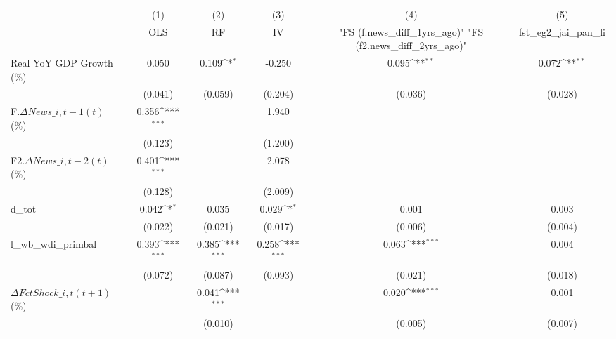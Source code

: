 {
\def\sym#1{\ifmmode^{#1}\else\(^{#1}\)\fi}
\begin{tabular}{l*{5}{c}}
\toprule
                    &\multicolumn{1}{c}{(1)}&\multicolumn{1}{c}{(2)}&\multicolumn{1}{c}{(3)}&\multicolumn{1}{c}{(4)}&\multicolumn{1}{c}{(5)}\\
                    &\multicolumn{1}{c}{OLS}&\multicolumn{1}{c}{RF}&\multicolumn{1}{c}{IV}&\multicolumn{1}{c}{ "FS (f.news\_diff\_1yrs\_ago)"  "FS (f2.news\_diff\_2yrs\_ago)" }&\multicolumn{1}{c}{fst\_eg2\_jai\_pan\_li}\\
\midrule
Real YoY GDP Growth (\%)&       0.050         &       0.109\sym{*}  &      -0.250         &       0.095\sym{**} &       0.072\sym{**} \\
                    &     (0.041)         &     (0.059)         &     (0.204)         &     (0.036)         &     (0.028)         \\
\addlinespace
F.$ \Delta News\_{i,t-1}(t)$ (\%)&       0.356\sym{***}&                     &       1.940         &                     &                     \\
                    &     (0.123)         &                     &     (1.200)         &                     &                     \\
\addlinespace
F2.$ \Delta News\_{i,t-2}(t)$ (\%)&       0.401\sym{***}&                     &       2.078         &                     &                     \\
                    &     (0.128)         &                     &     (2.009)         &                     &                     \\
\addlinespace
d\_tot               &       0.042\sym{*}  &       0.035         &       0.029\sym{*}  &       0.001         &       0.003         \\
                    &     (0.022)         &     (0.021)         &     (0.017)         &     (0.006)         &     (0.004)         \\
\addlinespace
l\_wb\_wdi\_primbal    &       0.393\sym{***}&       0.385\sym{***}&       0.258\sym{***}&       0.063\sym{***}&       0.004         \\
                    &     (0.072)         &     (0.087)         &     (0.093)         &     (0.021)         &     (0.018)         \\
\addlinespace
$ \Delta FctShock\_{i,t}(t+1)$ (\%)&                     &       0.041\sym{***}&                     &       0.020\sym{***}&       0.001         \\
                    &                     &     (0.010)         &                     &     (0.005)         &     (0.007)         \\

\end{tabular}}
